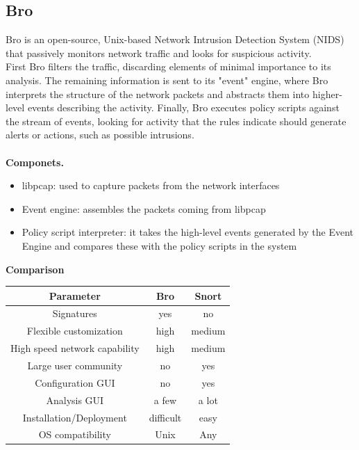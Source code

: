 \documentclass[10pt,a4paper]{book}
\begin{document}
\subsection{Bro}
Bro is an open-source, Unix-based Network Intrusion Detection System (NIDS) that passively monitors network traffic and looks for suspicious activity.\\
First Bro filters the traffic, discarding elements of minimal importance to its analysis. The remaining information is sent to its "event" engine, where Bro interprets the structure of the network packets and abstracts them into higher-level events describing the activity. Finally, Bro executes policy scripts against the stream of events, looking for activity that the rules indicate should generate alerts or actions, such as possible intrusions.\\\\
\textbf{Componets.}
\begin{itemize}[noitemsep,nolistsep]
\item libpcap: used to capture packets from the network interfaces
\item Event engine: assembles the packets coming from libpcap
\item Policy script interpreter: it takes the high-level events generated by the Event Engine and compares these with the policy scripts in the system
\end{itemize}
\vspace{1em}
\textbf{Comparison}\\
\begin{center}\begin{minipage}{8cm}
\begin{tabular}{|c|c|c|}
\hline 
{\bf Parameter} & {\bf Bro} & {\bf Snort} \\ 
\hline 
Signatures & yes & no \\ 
\hline 
Flexible customization & high & medium \\ 
\hline 
High speed network capability & high & medium \\ 
\hline 
Large user community & no & yes \\ 
\hline 
Configuration GUI & no & yes \\ 
\hline 
Analysis GUI & a few & a lot \\ 
\hline 
Installation/Deployment & difficult & easy \\ 
\hline 
OS compatibility & Unix & Any \\ 
\hline 
\end{tabular} 
\end{minipage}\end{center}
\end{document}

